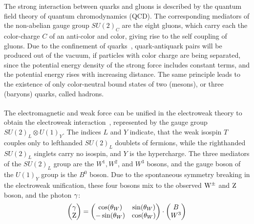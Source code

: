 The strong interaction between quarks and gluons is described by the quantum field theory of quantum chromodynamics (QCD). The corresponding mediators of the non-abelian gauge group $SU(2)_C$ are the eight gluons, which carry each the color-charge $C$ of an anti-color and color, giving rise to the self coupling of gluons. Due to the confinement of quarks~\cite{Confinement}, quark-antiquark pairs will be produced out of the vacuum, if particles with color charge are being separated, since the potential energy density of the strong force includes constant terms, and the potential energy rises with increasing distance. The same principle leads to the existence of only color-neutral bound states of two (mesons), or three (baryons) quarks, called hadrons.
\\\\
The electromagnetic and weak force can be unified in the electroweak theory to obtain the electroweak interaction~\cite{Weinberg,Weinberg2,Salam,Glashow}, represented by the gauge group $ SU(2)_L\otimes U(1)_Y$. The indices $L$ and $Y$ indicate, that the weak isospin $T$ couples only to lefthanded $SU(2)_L$ doublets of fermions, while the righthanded $SU(2)_L$ singlets carry no isospin, and $Y$ is the hypercharge. The three mediators of the $SU(2)_L$ group are the $W^1,W^2$, and $W^3$ bosons, and the gauge boson of the $U(1)_Y$ group is the $B^0$ boson.
Due to the spontaneous symmetry breaking in the electroweak unification, these four bosons mix to the observed $\mathrm{W}^\pm$ and $\mathrm{Z}$ boson, and the photon $\gamma$:
\begin{equation}
 \left(
 \begin{matrix}
  \gamma \\
  \mathrm{Z}
 \end{matrix}
 \right)
 =
 \left(\begin{matrix}
  \cos(\theta_W)  & \sin(\theta_W) \\
  -\sin(\theta_W) & \cos(\theta_W) 
 \end{matrix}\right)
 \cdot
 \left(
 \begin{matrix}
  B \\
  W^3
 \end{matrix}
 \right)
\end{equation}

